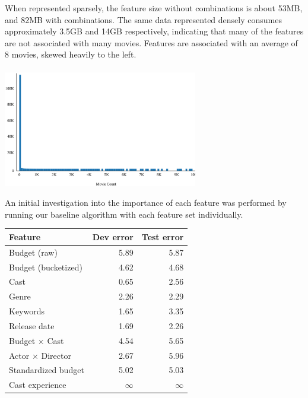\documentclass[journal]{IEEEtran}
\begin{document}
When represented sparsely, the feature size without combinations is about 53MB, and 82MB with combinations.  The same data represented
densely consumes approximately 3.5GB and 14GB respectively, indicating that many of the features are not associated with many movies.  Features are associated with an average of 8 movies, skewed heavily to the left. \\
\\
\includegraphics[width=8.5cm]{charts/movies_per_feature.eps}
\\
\par An initial investigation into the importance of each feature was performed by
running our baseline algorithm with each feature set individually.\\

\begin{center}
\begin{tabular}{|l|r r|} %
\hline
Feature & Dev error & Test error \\ [0.5ex] %
\hline %
Budget (raw) & 5.89 & 5.87 \\ %
Budget (bucketized) & 4.62 & 4.68 \\
Cast & 0.65 & 2.56 \\
Genre & 2.26 & 2.29 \\
Keywords & 1.65 & 3.35 \\
Release date & 1.69 & 2.26 \\
\hline
Budget $\times$ Cast & 4.54 & 5.65 \\
Actor $\times$ Director & 2.67 & 5.96 \\
\hline
Standardized budget & 5.02 & 5.03 \\
Cast experience & $\infty$ & $\infty$ \\
\hline
\end{tabular}
\end{center}
\smallskip
\end{document}
